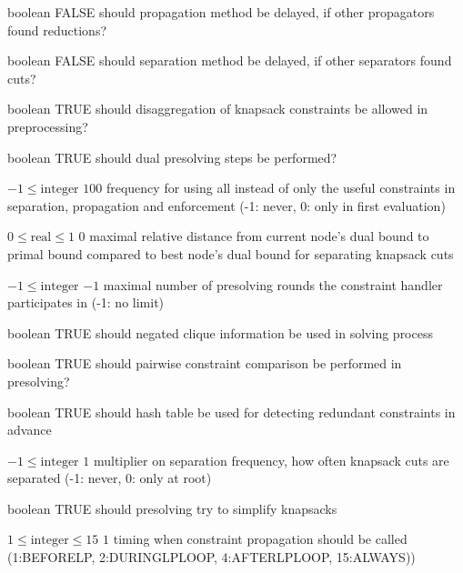 %
{boolean}%
{FALSE}%
{should propagation method be delayed, if other propagators found reductions?}%
{}

%
{boolean}%
{FALSE}%
{should separation method be delayed, if other separators found cuts?}%
{}

%
{boolean}%
{TRUE}%
{should disaggregation of knapsack constraints be allowed in preprocessing?}%
{}

%
{boolean}%
{TRUE}%
{should dual presolving steps be performed?}%
{}

%
{$-1\leq\textrm{integer}$}%
{$100$}%
{frequency for using all instead of only the useful constraints in separation, propagation and enforcement (-1: never, 0: only in first evaluation)}%
{}

%
{$0\leq\textrm{real}\leq1$}%
{$0$}%
{maximal relative distance from current node's dual bound to primal bound compared to best node's dual bound for separating knapsack cuts}%
{}

%
{$-1\leq\textrm{integer}$}%
{$-1$}%
{maximal number of presolving rounds the constraint handler participates in (-1: no limit)}%
{}

%
{boolean}%
{TRUE}%
{should negated clique information be used in solving process}%
{}

%
{boolean}%
{TRUE}%
{should pairwise constraint comparison be performed in presolving?}%
{}

%
{boolean}%
{TRUE}%
{should hash table be used for detecting redundant constraints in advance}%
{}

%
{$-1\leq\textrm{integer}$}%
{$1$}%
{multiplier on separation frequency, how often knapsack cuts are separated (-1: never, 0: only at root)}%
{}

%
{boolean}%
{TRUE}%
{should presolving try to simplify knapsacks}%
{}

%
{$1\leq\textrm{integer}\leq15$}%
{$1$}%
{timing when constraint propagation should be called (1:BEFORELP, 2:DURINGLPLOOP, 4:AFTERLPLOOP, 15:ALWAYS))}%
{}

